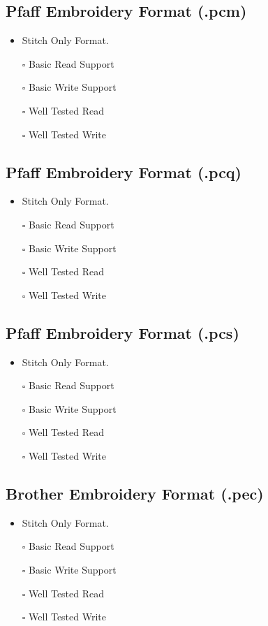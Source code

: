 \documentclass[onesize, a4paper]{refart}
\providecommand{\tightlist}{\setlength{\itemsep}{0pt}\setlength{\parskip}{0pt}}
\begin{document}
\subsection{Pfaff Embroidery Format (.pcm)}

\begin{itemize}
\tightlist
\item Stitch Only Format.
\item[$\square$] Basic Read Support
\item[$\square$] Basic Write Support
\item[$\square$] Well Tested Read
\item[$\square$] Well Tested Write
\end{itemize}

\subsection{Pfaff Embroidery Format (.pcq)}

\begin{itemize}
\tightlist
\item Stitch Only Format.
\item[$\square$] Basic Read Support
\item[$\square$] Basic Write Support
\item[$\square$] Well Tested Read
\item[$\square$] Well Tested Write
\end{itemize}

\subsection{Pfaff Embroidery Format (.pcs)}

\begin{itemize}
\tightlist
\item Stitch Only Format.
\item[$\square$] Basic Read Support
\item[$\square$] Basic Write Support
\item[$\square$] Well Tested Read
\item[$\square$] Well Tested Write
\end{itemize}

\subsection{Brother Embroidery Format (.pec)}

\begin{itemize}
\tightlist
\item Stitch Only Format.
\item[$\square$] Basic Read Support
\item[$\square$] Basic Write Support
\item[$\square$] Well Tested Read
\item[$\square$] Well Tested Write
\end{itemize}
\end{document}
